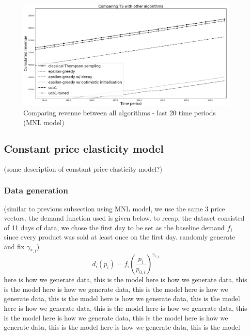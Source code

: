 \documentclass[a4paper]{article}
\begin{document}
\begin{figure}[h]
	\centering
	\includegraphics[width=1.03\textwidth]{Figure_1-4.png}
	\caption{\label{fig:three}Comparing revenue between all algorithms - last 20 time periods (MNL model)}
\end{figure}

\subsection{Constant price elasticity model}
(some description of constant price elasticity model?)
\subsubsection{Data generation}
(similar to previous subsection using MNL model, we use the same 3 price vectors. the demand function used is given below. to recap, the dataset consisted of 11 days of data, we chose the first day to be set as the baseline demand $f_i$ since every product was sold at least once on the first day. randomly generate and fix $\gamma_{*,i}$)
\[d_i(p_i) = f_i \left(\frac{p_i}{p_{0,i}}\right)^{\gamma_{*,i}} \]
here is how we generate data, this is the model here is how we generate data, this is the model here is how we generate data, this is the model here is how we generate data, this is the model here is how we generate data, this is the model here is how we generate data, this is the model here is how we generate data, this is the model here is how we generate data, this is the model here is how we generate data, this is the model here is how we generate data, this is the model 
\end{document}
